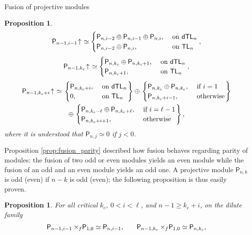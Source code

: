 \documentclass[reqno]{amsart}
\newtheorem{Prop}[Thm]{Proposition}
\newcommand{\dtl}[1]{\mathsf{dTL}_{#1}}
\newcommand{\tl}[1]{\mathsf{TL}_{#1}}
\newcommand{\dP}[1]{\mathsf P_{#1}}
\newcommand{\kc}{k_c}
\newcommand{\xf}{\times\hspace{-0.27em}_f}
\newcommand{\lc}{\ell}
\newcommand{\Ind}[1]{#1{}\hspace{-0.18em} \uparrow{}\hskip -0.18em}
\begin{document}
\begin{section}{Fusion of projective modules}
\begin{Prop}
\begin{equation}
\Ind{\dP{n-1,i-1}} \simeq \begin{cases}
\dP{n,i-2} \oplus \dP{n,i-1} \oplus \dP{n,i} \text{,} & \text{ on } \dtl{n}\\
\dP{n,i-2} \oplus \dP{n,i} , & \text{ on } \tl{n}
\end{cases},
\end{equation}
\begin{equation}
\Ind{\dP{n-1,\kc}} \simeq \begin{cases}
 \dP{n,\kc} \oplus \dP{n,\kc +1} \text{,} & \text{ on } \dtl{n}\\
\dP{n,\kc +1} , & \text{ on } \tl{n}
 \end{cases},
\end{equation}
\begin{multline}
\Ind{\dP{n-1,\kc+i}} \simeq \left. \begin{cases}
\dP{n,\kc+i},& \text{ on } \dtl{n}\\
0, & \text{ on } \tl{n}
\end{cases} \right\}
 \oplus \left.\begin{cases}
\dP{n,\kc} \oplus \dP{n,\kc}, & \text{ if } i=1\\
\dP{n,\kc +i-1}, & \text{ otherwise}
\end{cases}\right\} \\
\oplus \left.\begin{cases}
\dP{n,\kc -\lc} \oplus \dP{n,\kc + \lc}, & \text{ if } i=\lc-1\\
 \dP{n,\kc+i+1}, & \text{ otherwise}
 \end{cases}\right\},
\end{multline}
where it is understood that $\dP{n,j} \simeq 0$ if $j<0$.
\end{Prop}
Proposition \ref{prop:fusion_parity} described how fusion behaves regarding parity of modules: the fusion of two odd or even modules yields an even module while the fusion of an odd and an even module yields an odd one. A projective module $\dP{n,k}$ is odd (even) if $n-k$ is odd (even); the following proposition is thus easily proven.
\begin{Prop}\label{prop_fusion_pvs01}
For all critical $\kc$, $0<i<\lc$, and $n-1\geq \kc +i$, on the dilute family
\begin{equation}
\dP{n-1,i-1} \xf \dP{1,0} \simeq \dP{n,i-1} \text{,} \qquad \dP{n-1,\kc} \xf \dP{1,0} \simeq \dP{n,\kc},
\end{equation}
\begin{equation}

\end{equation}
\end{Prop}
\end{section}
\end{document}
